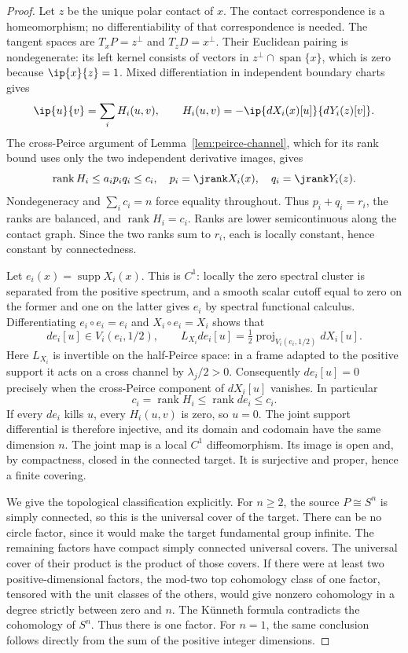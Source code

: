 \begin{proof}
Let $z$ be the unique polar contact of $x$. The contact correspondence is
a homeomorphism; no differentiability of that correspondence is needed.
The tangent spaces are $T_xP=z^\perp$ and $T_zD=x^\perp$.
Their Euclidean pairing is nondegenerate: its left kernel consists of
vectors in $z^\perp\cap\operatorname{span}\{x\}$, which is zero because
$\ip{x}{z}=1$. Mixed differentiation in independent boundary charts gives
\[
 \ip{u}{v}=\sum_i H_i(u,v),\qquad
 H_i(u,v)=-\ip{dX_i(x)[u]}{dY_i(z)[v]}.
\]
The cross-Peirce argument of Lemma~\ref{lem:peirce-channel}, which for its
rank bound uses only the two independent derivative images, gives
\[
 \operatorname{rank}H_i\leq a_ip_iq_i\leq c_i,
 \quad p_i=\jrank X_i(x),\quad q_i=\jrank Y_i(z).
\]
Nondegeneracy and $\sum_i c_i=n$ force equality throughout. Thus
$p_i+q_i=r_i$, the ranks are balanced, and $\operatorname{rank}H_i=c_i$.
Ranks are lower semicontinuous along the contact graph. Since the two
ranks sum to $r_i$, each is locally constant, hence constant by
connectedness.

Let $e_i(x)=\operatorname{supp}X_i(x)$. This is $C^1$: locally the zero
spectral cluster is separated from the positive spectrum, and a smooth
scalar cutoff equal to zero on the former and one on the latter gives
$e_i$ by spectral functional calculus. Differentiating
$e_i\circ e_i=e_i$ and $X_i\circ e_i=X_i$ shows that
\[
 de_i[u]\in V_i(e_i,1/2),\qquad
 L_{X_i}de_i[u]=\tfrac12\operatorname{proj}_{V_i(e_i,1/2)}dX_i[u].
\]
Here $L_{X_i}$ is invertible on the half-Peirce space: in a frame adapted
to the positive support it acts on a cross channel by $\lambda_j/2>0$.
Consequently $de_i[u]=0$ precisely when the cross-Peirce component of
$dX_i[u]$ vanishes. In particular
\[
 c_i=\operatorname{rank}H_i\leq\operatorname{rank}de_i\leq c_i.
\]
If every $de_i$ kills $u$, every $H_i(u,v)$ is zero, so $u=0$.
The joint support differential is therefore injective, and its domain and
codomain have the same dimension $n$. The joint map is a local
$C^1$ diffeomorphism. Its image is open and, by compactness, closed in the
connected target. It is surjective and proper, hence a finite covering.

We give the topological classification explicitly. For $n\geq2$, the
source $P\cong S^n$ is simply connected, so this is the universal cover of
the target. There can be no circle factor, since it would make the target
fundamental group infinite. The remaining factors have compact simply
connected universal covers. The universal cover of their product is the
product of those covers. If there were at least two positive-dimensional
factors, the mod-two top cohomology class of one factor, tensored with the
unit classes of the others, would give nonzero cohomology in a degree
strictly between zero and $n$. The K\"unneth formula contradicts the
cohomology of $S^n$. Thus there is one factor. For $n=1$, the same conclusion
follows directly from the sum of the positive integer dimensions.


\end{proof}

